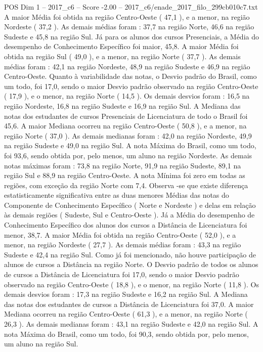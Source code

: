 \begin{textsample}{POS Dim 1 – 2017\_c6 – Score -2.00 – 2017\_c6/enade\_2017\_filo\_299cb010c7.txt}
A maior Média foi obtida na região Centro-Oeste ( 47,1 ), e a menor, na região Nordeste ( 37,2 ).
As demais médias foram : 37,7 na região Norte, 46,6 na região Sudeste e 45,8 na região Sul.
Já para os alunos dos cursos Presenciais, a Média do desempenho de Conhecimento Específico foi maior, 45,8.
A maior Média foi obtida na região Sul ( 49,0 ), e a menor, na região Norte ( 37,7 ).
As demais médias foram : 42,1 na região Nordeste, 48,9 na região Sudeste e 46,9 na região Centro-Oeste.
Quanto à variabilidade das notas, o Desvio padrão do Brasil, como um todo, foi 17,0, sendo o maior Desvio padrão observado na região Centro-Oeste ( 17,9 ), e o menor, na região Norte ( 14,5 ).
Os demais desvios foram : 16,5 na região Nordeste, 16,8 na região Sudeste e 16,9 na região Sul.
A Mediana das notas dos estudantes de cursos Presenciais de Licenciatura de todo o Brasil foi 45,6.
A maior Mediana ocorreu na região Centro-Oeste ( 50,8 ), e a menor, na região Norte ( 37,0 ).
As demais medianas foram : 42,0 na região Nordeste, 49,9 na região Sudeste e 49,0 na região Sul.
A nota Máxima do Brasil, como um todo, foi 93,6, sendo obtida por, pelo menos, um aluno na região Nordeste.
As demais notas máximas foram : 73,8 na região Norte, 91,9 na região Sudeste, 89,1 na região Sul e 88,9 na região Centro-Oeste.
A nota Mínima foi zero em todas as regiões, com exceção da região Norte com 7,4.
Observa -se que existe diferença estatisticamente significativa entre as duas menores Médias das notas do Componente de Conhecimento Específico ( Norte e Nordeste ) e delas em relação às demais regiões ( Sudeste, Sul e Centro-Oeste ).
Já a Média do desempenho de Conhecimento Específico dos alunos dos cursos a Distância de Licenciatura foi menor, 38,7.
A maior Média foi obtida na região Centro-Oeste ( 52,0 ), e a menor, na região Nordeste ( 27,7 ).
As demais médias foram : 43,3 na região Sudeste e 42,4 na região Sul.
Como já foi mencionado, não houve participação de alunos de cursos a Distância na região Norte.
O Desvio padrão de todos os alunos de cursos a Distância de Licenciatura foi 17,0, sendo o maior Desvio padrão observado na região Centro-Oeste ( 18,8 ), e o menor, na região Norte ( 11,8 ).
Os demais desvios foram : 17,3 na região Sudeste e 16,2 na região Sul.
A Mediana das notas dos estudantes de cursos a Distância de Licenciatura foi 37,0.
A maior Mediana ocorreu na região Centro-Oeste ( 61,3 ), e a menor, na região Norte ( 26,3 ).
As demais medianas foram : 43,1 na região Sudeste e 42,0 na região Sul.
A nota Máxima do Brasil, como um todo, foi 90,3, sendo obtida por, pelo menos, um aluno na região Sul.

\end{textsample}

